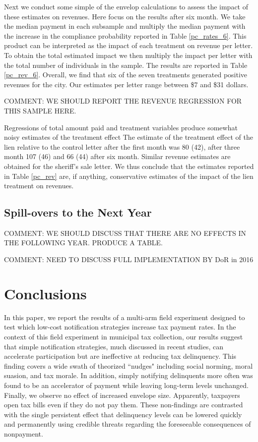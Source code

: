 \documentclass[12pt]{article}
\begin{document}
Next we conduct some simple of the envelop calculations to assess the impact of these estimates on revenues. Here focus on the results after six month. We take the median payment in each subsample and multiply the median payment with the increase in the compliance probability reported in Table \ref{pc_rates_6}. This product can be interpreted as the impact of each treatment on revenue per letter. To obtain the total estimated impact we then multiply the impact per letter with the total number of individuals in the sample. The results are reported in Table \ref{pc_rev_6}.
Overall, we find that six of the seven treatments generated positive revenues for the city. Our estimates per letter range between \$7 and \$31 dollars.

\noindent COMMENT: WE SHOULD REPORT THE REVENUE REGRESSION FOR THIS SAMPLE HERE. 

Regressions of total amount paid and treatment variables produce somewhat noisy estimates of the treatment effect
The estimate of the treatment effect of the lien relative to the control letter after the first month was 80 (42), after three month 107 (46) and 66 (44) after six month. Similar 
revenue estimates are obtained for the sheriff's sale letter.  We thus conclude that  the estimates reported in Table \ref{pc_rev} are, if anything, conservative estimates of the impact of the lien treatment on revenues.

\subsection{Spill-overs to the Next Year}

\noindent COMMENT: WE SHOULD DISCUSS THAT THERE ARE NO EFFECTS IN THE FOLLOWING YEAR. PRODUCE A TABLE.

\noindent COMMENT: NEED TO DISCUSS FULL IMPLEMENTATION BY DoR in 2016


\section{Conclusions}

In this paper, we report the results of a multi-arm field experiment 
designed to test which low-cost notification strategies increase tax 
payment rates. In the context of this field experiment in municipal 
tax collection, our results suggest that simple notification strategies, 
much discussed in recent studies, can accelerate participation but are 
ineffective at reducing tax delinquency. This finding covers a 
wide swath of theorized  ``nudges" including social norming, moral suasion, 
and tax morale. In addition, simply notifying delinquents more often was 
found to be an accelerator of payment while leaving long-term levels 
unchanged. Finally, we observe no effect of increased envelope size. 
Apparently, taxpayers open tax bills even if they do not pay them.
These non-findings are contrasted with the single persistent effect 
that delinquency levels can be lowered quickly and permanently using 
credible threats regarding the foreseeable consequences of nonpayment. 
\end{document}
